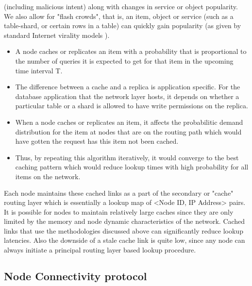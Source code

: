 (including malicious intent) along with changes in service or object popularity. We also allow for "flash crowds", that
is, an item, object or service (such as a table-shard, or certain rows in a table) can quickly gain popularity (as given
by standard Internet virality models \cite{virality_model}).
\begin{itemize}
    \item A node caches or replicates an item with a probability that is proportional to the number of queries it is
        expected to get for that item in the upcoming time interval T.
    \item The difference between a cache and a replica is application specific. For the database application that the
        network layer hosts, it depends on whether a particular table or a shard is allowed to have write permissions on
        the replica.
    \item When a node caches or replicates an item, it affects the probabilitic demand distribution for the item at
        nodes that are on the routing path which would have gotten the request has this item not been cached.
    \item Thus, by repeating this algorithm iteratively, it would converge to the best caching pattern which would reduce
        lookup times with high probability for all items on the network.
\end{itemize}
Each node maintains these cached links as a part of the secondary or "cache" routing layer which is essentially a lookup
map of \textsf{<Node ID, IP Address>} pairs. It is possible for nodes to maintain relatively large caches since they are only
limited by the memory and node dynamic characteristics of the network. Cached links that use the methodologies discussed
above can significantly reduce lookup latencies. Also the downside of a stale cache link is quite low, since any node
can always initiate a principal routing layer based lookup procedure.

\subsection{Node Connectivity protocol}
\label{net:net_proto}

